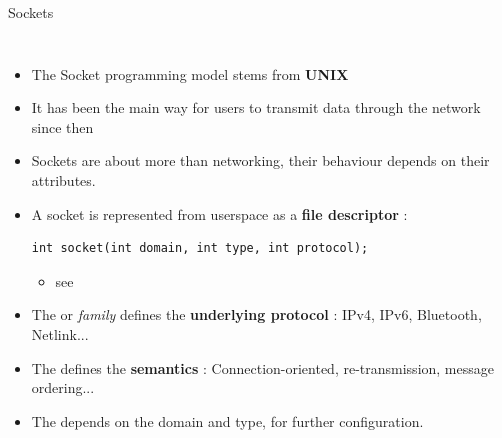 \begin{frame}[fragile]{Sockets}
\begin{columns}
\begin{itemize}
		\item The Socket programming model stems from \textbf{UNIX}
		\item It has been the main way for users to transmit data through the network since then
		\item Sockets are about more than networking, their behaviour depends on their attributes.
		\item A socket is represented from userspace as a \textbf{file descriptor} : \\
			\begin{verbatim}
int socket(int domain, int type, int protocol);
			\end{verbatim}
				\begin{itemize}
					\item see 
				\end{itemize}
		\item The  or \textit{family} defines the \textbf{underlying protocol} : IPv4, IPv6, Bluetooth, Netlink...
		\item The  defines the \textbf{semantics} : Connection-oriented, re-transmission, message ordering...
		\item The  depends on the domain and type, for further configuration.
		\end{itemize}
	\end{columns}
\end{frame}

